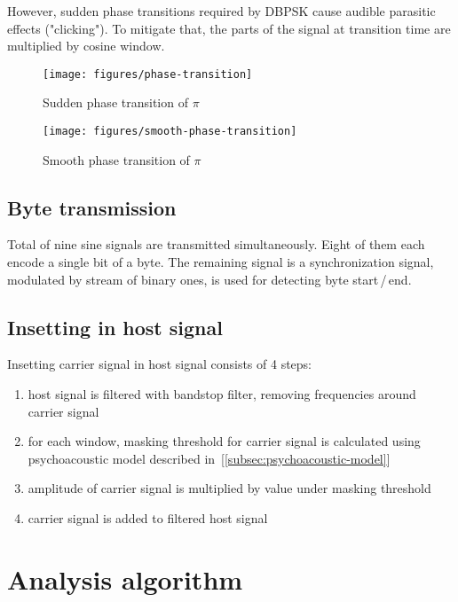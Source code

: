 However, sudden phase transitions required by DBPSK cause audible parasitic effects ("clicking"). To mitigate that, the parts of the signal at transition time are multiplied by cosine window.

\begin{figure}[h]
  \texttt{[image: figures/phase-transition]}
  \caption{Sudden phase transition of $\pi$}
  \label{fig:phase-transition}
\end{figure}

\begin{figure}[h]
  \texttt{[image: figures/smooth-phase-transition]}
  \caption{Smooth phase transition of $\pi$}
  \label{fig:smooth-phase-transition}
\end{figure}

\subsection{Byte transmission}

Total of nine sine signals are transmitted simultaneously. Eight of them each encode a single bit of a byte. The remaining signal is a synchronization signal, modulated by stream of binary ones, is used for detecting byte start\,/\,end.


\subsection{Insetting in host signal}

Insetting carrier signal in host signal consists of 4 steps:

\begin{enumerate}
\item host signal is filtered with bandstop filter, removing frequencies around carrier signal
\item for each window, masking threshold for carrier signal is calculated using psychoacoustic model described in~[\ref{subsec:psychoacoustic-model}]
\item amplitude of carrier signal is multiplied by value under masking threshold
\item carrier signal is added to filtered host signal
\end{enumerate}

\section{Analysis algorithm}

